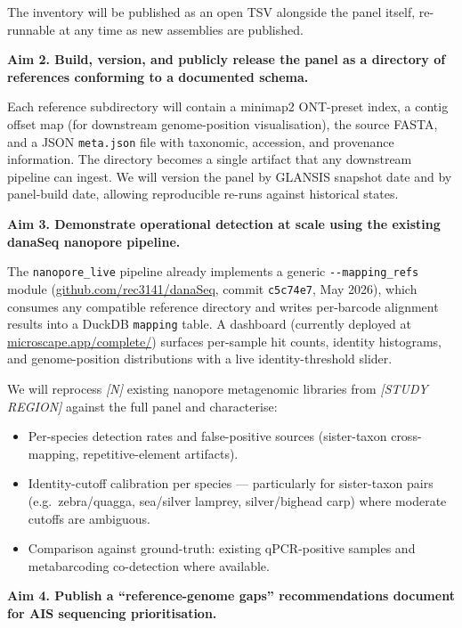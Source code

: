 \documentclass[11pt, letterpaper]{article}
\newcommand{\placeholder}[1]{\textcolor{mutedgray}{\textit{[#1]}}}
\newcommand{\aim}[1]{%
  \par\medskip%
  \noindent\colorbox{black!4}{%
    \parbox{\dimexpr\linewidth-2\fboxsep}{\textbf{#1}}%
  }\par\medskip%
}
\begin{document}
The inventory will be published as an open TSV alongside the panel itself, re-runnable at any time as new assemblies are published.

\aim{Aim 2. Build, version, and publicly release the panel as a directory of references conforming to a documented schema.}

Each reference subdirectory will contain a minimap2 ONT-preset index, a contig offset map (for downstream genome-position visualisation), the source FASTA, and a JSON \texttt{meta.json} file with taxonomic, accession, and provenance information. The directory becomes a single artifact that any downstream pipeline can ingest. We will version the panel by GLANSIS snapshot date and by panel-build date, allowing reproducible re-runs against historical states.

\aim{Aim 3. Demonstrate operational detection at scale using the existing danaSeq nanopore pipeline.}

The \texttt{nanopore\_live} pipeline already implements a generic \texttt{-{}-mapping\_refs} module (\href{https://github.com/rec3141/danaSeq}{github.com/rec3141/danaSeq}, commit \texttt{c5c74e7}, May 2026), which consumes any compatible reference directory and writes per-barcode alignment results into a DuckDB \texttt{mapping} table. A dashboard (currently deployed at \href{https://microscape.app/complete/}{microscape.app/complete/}) surfaces per-sample hit counts, identity histograms, and genome-position distributions with a live identity-threshold slider.

We will reprocess \placeholder{N} existing nanopore metagenomic libraries from \placeholder{STUDY REGION} against the full panel and characterise:

\begin{itemize}[leftmargin=1.5em]
  \item Per-species detection rates and false-positive sources (sister-taxon cross-mapping, repetitive-element artifacts).
  \item Identity-cutoff calibration per species --- particularly for sister-taxon pairs (e.g.\ zebra/quagga, sea/silver lamprey, silver/bighead carp) where moderate cutoffs are ambiguous.
  \item Comparison against ground-truth: existing qPCR-positive samples and metabarcoding co-detection where available.
\end{itemize}

\aim{Aim 4. Publish a ``reference-genome gaps'' recommendations document for AIS sequencing prioritisation.}
\end{document}
